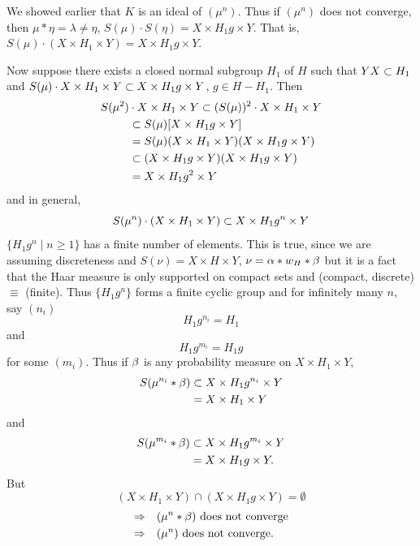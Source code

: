 We showed earlier that $K$ is an ideal of $(\mu^n)$. 
Thus if $(\mu^n)$ does not converge, then $\mu * \eta = \lambda \not= \eta$, $S(\mu) \cdot S(\eta) = X \times H_1 g \times Y$.  
That is, $S(\mu) \cdot (X \times H_1 \times Y) = X \times H_1 g \times Y$.

Now suppose there exists a closed normal subgroup $H_1$ of $H$ such that $YX \subset H_1$ and $S(\mu) \cdot X \times H_1 \times Y \subset X \times H_1 g \times Y$, $g \in H-H_1$.  
Then
\[
\begin{aligned}
       S(\mu^2) &\cdot X \times H_1 \times Y \subset (S(\mu))^2
               \cdot X \times H_1 \times Y                             \\
       &\subset S(\mu) [X \times H_1 g \times Y]                           \\
       &= S(\mu) (X \times H_1 \times Y)(X \times H_1 g \times Y)              \\
       &\subset (X \times H_1 g \times Y)(X \times H_1 g \times Y)                 \\
       &= X \times H_1 g^2 \times Y
\end{aligned}
\]
and in general,
\[
     S(\mu^n) \cdot (X \times H_1 \times Y) \subset X \times H_1 g^n \times Y
\]
$\{ H_1 g^n \mid n \ge 1 \}$ has a finite number of elements.  
This is true, since we are assuming discreteness and $S(\nu) = X \times H \times Y$, $\nu = \alpha * w_H * \beta$ but it is a fact that the Haar measure is only supported on compact sets and (compact, discrete) $\equiv$ (finite).
Thus $\{ H_1g^n \}$ forms a finite cyclic group and for infinitely
many $n$, say $(n_i)$
\[
     H_1 g^{n_i} = H_1
\]
and
\[
     H_1 g^{m_i} = H_1 g
\]
for some $(m_i)$.  
Thus if $\beta$ is any probability measure on $X \times H_1 \times Y$,
\[
\begin{aligned}
       S(\mu^{n_i} * \beta) &\subset X \times H_1 g^{n_i} \times Y           \\
       &= X \times H_1 \times Y
\end{aligned}
\]
and
\[
\begin{aligned}
       S(\mu^{m_i} * \beta) &\subset X \times H_1 g^{m_i} \times Y           \\
       &= X \times H_1 g \times Y.
\end{aligned}
\]
But
\[
     (X \times H_1 \times Y) \cap (X \times H_1 g \times Y) = \emptyset
\]
\[
\begin{aligned}
       \Rightarrow &\quad (\mu^n * \beta) \hbox{ does not converge}      \\
       \Rightarrow &\quad (\mu^n) \hbox{ does not converge.}
\end{aligned}
\]

